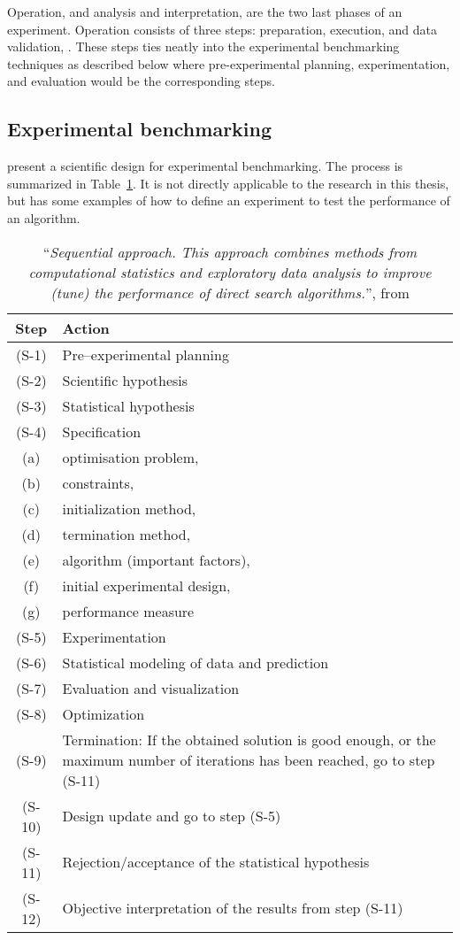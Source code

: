 Operation, and analysis and interpretation, are the two last phases of an experiment. Operation consists of three steps: preparation, execution, and data validation, \parencite{Wohlin2000}. These steps ties neatly into the experimental benchmarking techniques as described below where pre-experimental planning, experimentation, and evaluation would be the corresponding steps.

\subsection{Experimental benchmarking}
\cite{Bartz-Beielstein2004} present a scientific design for experimental benchmarking. The process is summarized in Table~\ref{tab:experimentsequence}. It is not directly applicable to the research in this thesis, but has some examples of how to define an experiment to test the performance of an algorithm.

\begin{table}[htdp]
\footnotesize
\begin{center}
\begin{tabular}{|c|p{10cm}|}
\hline
Step & Action\\
\hline
(S-1) & Pre–experimental planning\\
(S-2) & Scientific hypothesis\\
(S-3) & Statistical hypothesis\\
(S-4) & Specification\\
(a) & optimisation problem,\\
(b) & constraints,\\
(c) & initialization method,\\
(d) & termination method,\\
(e) & algorithm (important factors),\\ 
(f) & initial experimental design,\\ 
(g) & performance measure\\
(S-5) & Experimentation\\
(S-6) & Statistical modeling of data and prediction\\
(S-7) & Evaluation and visualization\\
(S-8) & Optimization\\
(S-9) & Termination: If the obtained solution is good enough, or the maximum number of iterations has
been reached, go to step (S-11)\\
(S-10) & Design update and go to step (S-5)\\
(S-11) & Rejection/acceptance of the statistical hypothesis\\
(S-12) & Objective interpretation of the results from step (S-11)\\
\hline
\end{tabular}
\caption{``\textit{Sequential approach. This approach combines methods from computational statistics and exploratory data analysis to improve (tune) the performance of direct search algorithms.}'', from \protect \cite[p. 417]{Bartz-Beielstein2004}}
\label{tab:experimentsequence}
\end{center}
\end{table}

